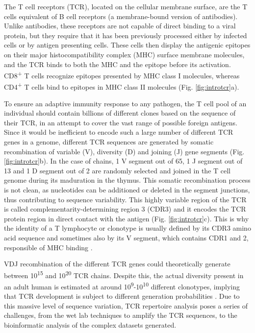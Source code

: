 The T cell receptors (TCR), located on the cellular membrane surface, are the T cells equivalent of B cell receptors (a membrane-bound version of antibodies). Unlike antibodies, these receptors are not capable of direct binding to a viral protein, but they require that it has been previously processed either by infected cells or by antigen presenting cells. These cells then display the antigenic epitopes on their major histocompatibility complex (MHC) surface membrane molecules, and the TCR binds to both the MHC and the epitope before its activation. CD8\textsuperscript{+} T cells recognize epitopes presented by MHC class I molecules, whereas CD4\textsuperscript{+} T cells bind to epitopes in MHC class II molecules \citep{janeway} (Fig. \ref{fig:introtcr}a).

To ensure an adaptive immunity response to any pathogen, the T cell pool of an individual should contain billions of different clones based on the sequence of their TCR, in an attempt to cover the vast range of possible foreign antigens. Since it would be inefficient to encode such a large number of different TCR genes in a genome, different TCR sequences are generated by somatic recombination of variable (V), diversity (D) and joining (J) gene segments (Fig. \ref{fig:introtcr}b). In the case of \TCRB{} chains, 1 V segment out of 65, 1 J segment out of 13 and 1 D segment out of 2 are randomly selected and joined in the T cell genome during its maduration in the thymus. This somatic recombination process is not clean, as nucleotides can be additioned or deleted in the segment junctions, thus contributing to sequence variability. This highly variable region of the TCR is called complementarity-determining region 3 (CDR3) and it encodes the TCR protein region in direct contact with the antigen (Fig. \ref{fig:introtcr}c). This is why the identity of a T lymphocyte or clonotype is usually defined by its CDR3 amino acid sequence and sometimes also by its V segment, which contains CDR1 and 2, responsible of MHC binding \citep{cdr12mhc}.

VDJ recombination of the different TCR genes could theoretically generate between 10\textsuperscript{15} and 10\textsuperscript{20} TCR chains. Despite this, the actual diversity present in an adult human is estimated at around 10\textsuperscript{9}-10\textsuperscript{10} different clonotypes, implying that TCR development is subject to different generation probabilities \citep{tcrdiv}. Due to this massive level of sequence variation, TCR repertoire analysis poses a series of challenges, from the wet lab techniques to amplify the TCR sequences, to the bioinformatic analysis of the complex datasets generated.

